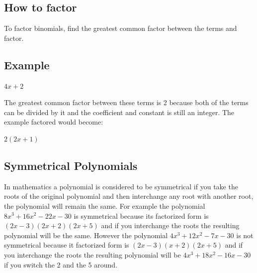 \subsection{How to factor}
\label{sss:howt-b6a0}




To factor binomials, find the greatest common factor between the terms and factor.




\subsection{Example}
\label{sss:exam-1a79}




$4x + 2$



The greatest common factor between these terms is 2 because both of the terms can be
divided by it and the coefficient and constant is still an integer. The example factored
would become:



$2(2x+1)$




\subsection{Symmetrical Polynomials}
\label{sss:symm-5fd8}




In mathematics a polynomial is considered to be symmetrical if you take the roots of the
original polynomial and then interchange any root with another root, the polynomial will
remain the same. For example the polynomial $8x^3 + 16x^2 - 22x - 30$ is symmetrical
because its factorized form is $(2x - 3)(2x + 2)(2x + 5)$ and if you interchange the roots
the resulting polynomial will be the same. However the polynomial $4x^3 + 12x^2 - 7x - 30$
is not symmetrical because it factorized form is $(2x - 3)(x + 2)(2x + 5)$ and if you
interchange the roots the resulting polynomial will be $4x^3 + 18x^2 - 16x - 30$ if you
switch the 2 and the 5 around.





